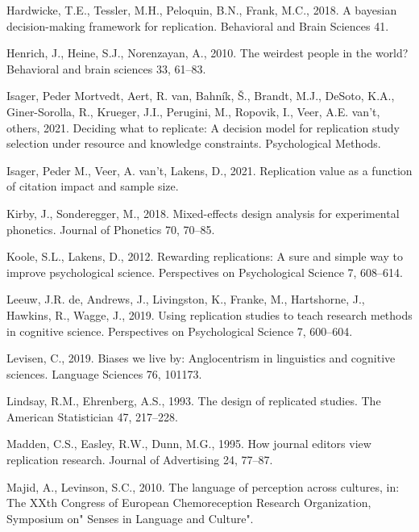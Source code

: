 \documentclass[]{elsarticle} %
\newlength{\cslhangindent}
\newlength{\cslentryspacingunit} %
\newenvironment{CSLReferences}[2] %
 {%
  \setlength{\parindent}{0pt}
  \ifodd #1
  \let\oldpar\par
  \def\par{\hangindent=\cslhangindent\oldpar}
  \fi
  \setlength{\parskip}{#2\cslentryspacingunit}
 }%
 {}
\begin{document}
\begin{CSLReferences}{1}{0}
\leavevmode\hypertarget{ref-hardwicke2018bayesian}{}%
Hardwicke, T.E., Tessler, M.H., Peloquin, B.N., Frank, M.C., 2018. A bayesian decision-making framework for replication. Behavioral and Brain Sciences 41.

\leavevmode\hypertarget{ref-henrich2010weirdest}{}%
Henrich, J., Heine, S.J., Norenzayan, A., 2010. The weirdest people in the world? Behavioral and brain sciences 33, 61--83.

\leavevmode\hypertarget{ref-isager2021deciding}{}%
Isager, Peder Mortvedt, Aert, R. van, Bahník, Š., Brandt, M.J., DeSoto, K.A., Giner-Sorolla, R., Krueger, J.I., Perugini, M., Ropovik, I., Veer, A.E. van't, others, 2021. Deciding what to replicate: A decision model for replication study selection under resource and knowledge constraints. Psychological Methods.

\leavevmode\hypertarget{ref-isager2021replication}{}%
Isager, Peder M., Veer, A. van't, Lakens, D., 2021. Replication value as a function of citation impact and sample size.

\leavevmode\hypertarget{ref-kirby2018mixed}{}%
Kirby, J., Sonderegger, M., 2018. Mixed-effects design analysis for experimental phonetics. Journal of Phonetics 70, 70--85.

\leavevmode\hypertarget{ref-koole_rewarding_2012}{}%
Koole, S.L., Lakens, D., 2012. Rewarding replications: {A} sure and simple way to improve psychological science. Perspectives on Psychological Science 7, 608--614.

\leavevmode\hypertarget{ref-de2019using}{}%
Leeuw, J.R. de, Andrews, J., Livingston, K., Franke, M., Hartshorne, J., Hawkins, R., Wagge, J., 2019. Using replication studies to teach research methods in cognitive science. Perspectives on Psychological Science 7, 600--604.

\leavevmode\hypertarget{ref-levisen2019biases}{}%
Levisen, C., 2019. Biases we live by: Anglocentrism in linguistics and cognitive sciences. Language Sciences 76, 101173.

\leavevmode\hypertarget{ref-lindsay1993design}{}%
Lindsay, R.M., Ehrenberg, A.S., 1993. The design of replicated studies. The American Statistician 47, 217--228.

\leavevmode\hypertarget{ref-madden_how_1995}{}%
Madden, C.S., Easley, R.W., Dunn, M.G., 1995. How journal editors view replication research. Journal of Advertising 24, 77--87.

\leavevmode\hypertarget{ref-majid2010language}{}%
Majid, A., Levinson, S.C., 2010. The language of perception across cultures, in: The XXth Congress of European Chemoreception Research Organization, Symposium on" Senses in Language and Culture".


\end{CSLReferences}
\end{document}
